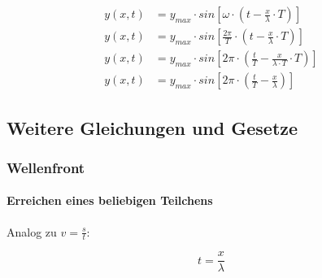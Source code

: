 \begin{align*}
	y(x,t) &= y_{max} \cdot sin{[\omega \cdot (t-\frac{x}{\lambda} \cdot T)]} \\
	y(x,t) &= y_{max} \cdot sin{[\frac{2\pi}{T} \cdot (t-\frac{x}{\lambda} \cdot T)]} \\
	y(x,t) &= y_{max} \cdot sin{[2\pi \cdot (\frac{t}{T}-\frac{x}{\lambda \cdot T} \cdot T)]} \\
	y(x,t) &= y_{max} \cdot sin{[2\pi \cdot (\frac{t}{T}-\frac{x}{\lambda})]}
\end{align*}



\subsection{Weitere Gleichungen und Gesetze}

\subsubsection{Wellenfront}

\paragraph{Erreichen eines beliebigen Teilchens}

Analog zu $v=\frac{s}{t}$:

\begin{equation*}
	t=\frac{x}{\lambda}
\end{equation*}












